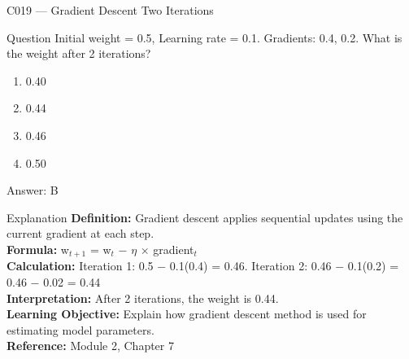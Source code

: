 \documentclass[aspectratio=169,8pt]{beamer}
\begin{document}
	\begin{frame}{C019 --- Gradient Descent Two Iterations}
		\begin{block}{Question}
			Initial weight = 0.5, Learning rate = 0.1. Gradients: 0.4, 0.2. What is the weight after 2 iterations?
			\begin{enumerate}
				\item 0.40
				\item 0.44
				\item 0.46
				\item 0.50
			\end{enumerate}
		\end{block}
		\begin{exampleblock}{Answer: B}\end{exampleblock}
		\begin{block}{Explanation}
			\textbf{Definition:} Gradient descent applies sequential updates using the current gradient at each step.\\
			\textbf{Formula:} w$_{t+1}$ = w$_{t}$ $-$ $\eta$ $\times$ gradient$_{t}$\\
			\textbf{Calculation:} Iteration 1: 0.5 $-$ 0.1(0.4) = 0.46. Iteration 2: 0.46 $-$ 0.1(0.2) = 0.46 $-$ 0.02 = 0.44\\
			\textbf{Interpretation:} After 2 iterations, the weight is 0.44.\\
			\textbf{Learning Objective:} Explain how gradient descent method is used for estimating model parameters.\\
			\textbf{Reference:} Module 2, Chapter 7
		\end{block}
	\end{frame}
	
\end{document}
